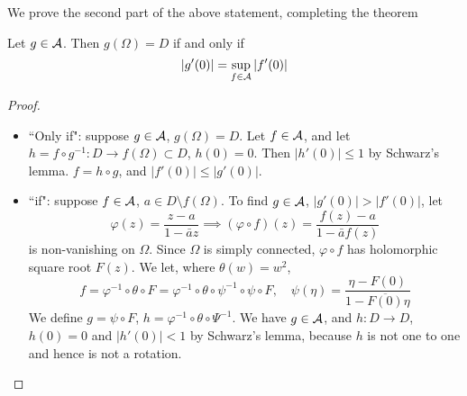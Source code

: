\documentclass{article}
\begin{document}
We prove the second part of the above statement, completing the theorem
\begin{lemma}
Let \(g \in \mathcal{A}\). Then \(g(\Omega) = D\) if and only if
\begin{equation}|g'(0)| = \sup_{f \in \mathcal{A}}|f'(0)|\end{equation}
\end{lemma}
\begin{proof}
\begin{itemize}

  \item ``Only if": suppose \(g \in \mathcal{A}\), \(g(\Omega) = D\). Let \(f \in \mathcal{A}\), and let \(h = f \circ g^{-1}: D \to f(\Omega) \subset D\), \(h(0) = 0\). Then \(|h'(0)| \leq 1\) by Schwarz's lemma. \(f = h \circ g\), and \(|f'(0)| \leq |g'(0)|\).

  \item ``if": suppose \(f \in \mathcal{A}\), \(a \in D \setminus f(\Omega)\). To find \(g \in \mathcal{A}\), \(|g'(0)| > |f'(0)|\), let
  \begin{equation}\varphi(z) = \frac{z - a}{1 - \bar{a}z} \implies (\varphi \circ f)(z) = \frac{f(z) - a}{1 - \bar{a}f(z)}\end{equation}
  is non-vanishing on \(\Omega\). Since \(\Omega\) is simply connected, \(\varphi \circ f\) has holomorphic square root \(F(z)\). We let, where \(\theta(w) = w^2\),
  \begin{equation}f = \varphi^{-1} \circ \theta \circ F = \varphi^{-1} \circ \theta \circ \psi^{-1} \circ \psi \circ F, \quad \psi(\eta) = \frac{\eta - F(0)}{1 - \overline{F(0)}\eta}\end{equation}
  We define \(g = \psi \circ F\), \(h = \varphi^{-1} \circ \theta \circ \Psi^{-1}\). We have \(g \in \mathcal{A}\), and \(h: D \to D\), \(h(0) = 0\) and \(|h'(0)| < 1\) by Schwarz's lemma, because \(h\) is not one to one and hence is not a rotation.

\end{itemize}
\end{proof}

\end{document}
